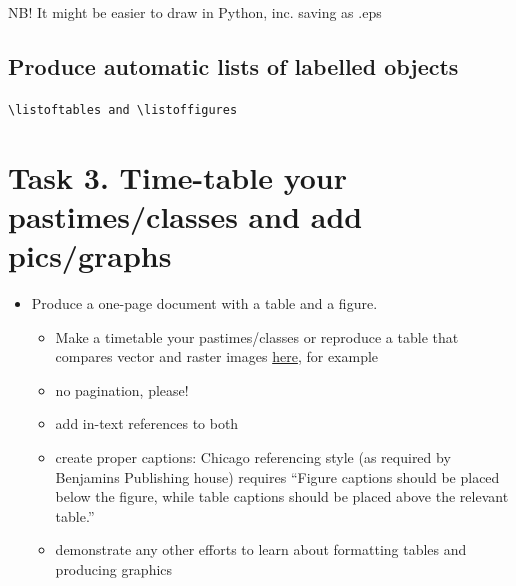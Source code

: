 \documentclass[a4paper,11pt]{article}
\begin{document}

NB! It might be easier to draw in Python, inc. saving as .eps

\subsection{Produce automatic lists of labelled objects}

\verb|\listoftables and \listoffigures|

\listoftables
\listoffigures

\section*{Task 3. Time-table your pastimes/classes and add pics/graphs}
\label{task}

\begin{tcolorbox}[width=\textwidth, colback={yellow!40!white}, title={}, colbacktitle=yellow!60!white, coltitle=black]
	\begin{itemize}
		\item Produce a one-page document with a table and a figure. 
		\begin{itemize}
			\item Make a timetable your pastimes/classes or reproduce a table that compares vector and raster images \href{https://tinyurl.com/yf8orxog}{here}, for example
			\item no pagination, please!
			\item add in-text references to both
			\item create proper captions: Chicago referencing style (as required by Benjamins Publishing house) requires ``Figure captions should be placed below the figure, while table captions should be placed above the relevant table.''
			\item demonstrate any other efforts to learn about formatting tables and producing graphics 
		\end{itemize} 
	\end{itemize}
	
\end{tcolorbox}%
\end{document}
